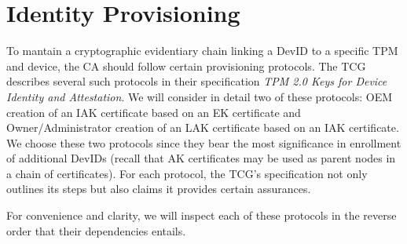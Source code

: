 \chapter{Identity Provisioning}

To mantain a cryptographic evidentiary chain linking a DevID to a specific TPM and device, the CA should follow certain provisioning protocols. The TCG describes several such protocols in their specification \textit{TPM 2.0 Keys for Device Identity and Attestation}. We will consider in detail two of these protocols: OEM creation of an IAK certificate based on an EK certificate and Owner/Administrator creation of an LAK certificate based on an IAK certificate. We choose these two protocols since they bear the most significance in enrollment of additional DevIDs (recall that AK certificates may be used as parent nodes in a chain of certificates). For each protocol, the TCG's specification not only outlines its steps but also claims it provides certain assurances.

For convenience and clarity, we will inspect each of these protocols in the reverse order that their dependencies entails.

